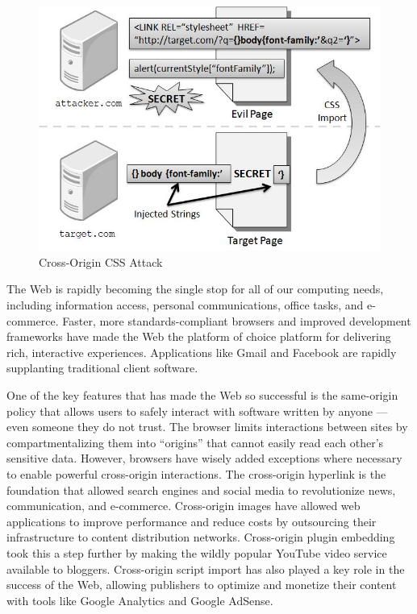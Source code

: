\documentclass{acm_proc_article-sp}
\begin{document}
\begin{figure}
\centering
\includegraphics[width=\linewidth]{injection.jpg}
\caption{Cross-Origin CSS Attack}
\label{figure:injection}
\end{figure}

The Web is rapidly becoming the single stop for all of our computing needs,
including information access, personal communications, office tasks, and
e-commerce. Faster, more standards-compliant browsers and improved development
frameworks have made the Web the platform of choice platform for delivering
rich, interactive experiences. Applications like Gmail and Facebook are
rapidly supplanting traditional client software.

One of the key features that has made the Web so successful is the same-origin
policy that allows users to safely interact with software written by anyone
--- even someone they do not trust. The browser limits interactions between
sites by compartmentalizing them into ``origins'' that cannot easily read
each other's sensitive data. However, browsers have wisely added exceptions
where necessary to enable powerful cross-origin interactions. The cross-origin
hyperlink is the foundation that allowed search engines and social media to
revolutionize news, communication, and e-commerce. Cross-origin images have
allowed web applications to improve performance and reduce costs by
outsourcing their infrastructure to content distribution networks.
Cross-origin plugin embedding took this a step further by making the wildly
popular YouTube video service available to bloggers. Cross-origin script
import has also played a key role in the success of the Web, allowing
publishers to optimize and monetize their content with tools like Google
Analytics and Google AdSense.
\end{document}
